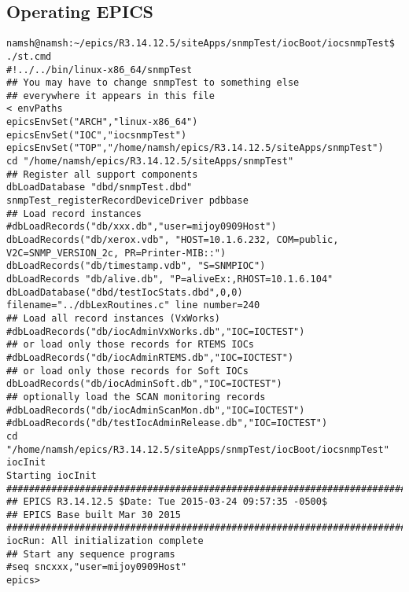 \documentclass[11pt
  , a4paper
  , article
  , oneside
]{memoir}
\begin{document}
\subsection{Operating EPICS}
\begin{lstlisting}[style=termstyle]
namsh@namsh:~/epics/R3.14.12.5/siteApps/snmpTest/iocBoot/iocsnmpTest$ ./st.cmd 
#!../../bin/linux-x86_64/snmpTest
## You may have to change snmpTest to something else
## everywhere it appears in this file
< envPaths
epicsEnvSet("ARCH","linux-x86_64")
epicsEnvSet("IOC","iocsnmpTest")
epicsEnvSet("TOP","/home/namsh/epics/R3.14.12.5/siteApps/snmpTest")
cd "/home/namsh/epics/R3.14.12.5/siteApps/snmpTest"
## Register all support components
dbLoadDatabase "dbd/snmpTest.dbd"
snmpTest_registerRecordDeviceDriver pdbbase
## Load record instances
#dbLoadRecords("db/xxx.db","user=mijoy0909Host")
dbLoadRecords("db/xerox.vdb", "HOST=10.1.6.232, COM=public, V2C=SNMP_VERSION_2c, PR=Printer-MIB::")
dbLoadRecords("db/timestamp.vdb", "S=SNMPIOC")
dbLoadRecords "db/alive.db", "P=aliveEx:,RHOST=10.1.6.104"
dbLoadDatabase("dbd/testIocStats.dbd",0,0)
filename="../dbLexRoutines.c" line number=240
## Load all record instances (VxWorks)
#dbLoadRecords("db/iocAdminVxWorks.db","IOC=IOCTEST")
## or load only those records for RTEMS IOCs
#dbLoadRecords("db/iocAdminRTEMS.db","IOC=IOCTEST")
## or load only those records for Soft IOCs
dbLoadRecords("db/iocAdminSoft.db","IOC=IOCTEST")
## optionally load the SCAN monitoring records
#dbLoadRecords("db/iocAdminScanMon.db","IOC=IOCTEST")
#dbLoadRecords("db/testIocAdminRelease.db","IOC=IOCTEST")
cd "/home/namsh/epics/R3.14.12.5/siteApps/snmpTest/iocBoot/iocsnmpTest"
iocInit
Starting iocInit
############################################################################
## EPICS R3.14.12.5 $Date: Tue 2015-03-24 09:57:35 -0500$
## EPICS Base built Mar 30 2015
############################################################################
iocRun: All initialization complete
## Start any sequence programs
#seq sncxxx,"user=mijoy0909Host"
epics> 
\end{lstlisting}
\end{document}
